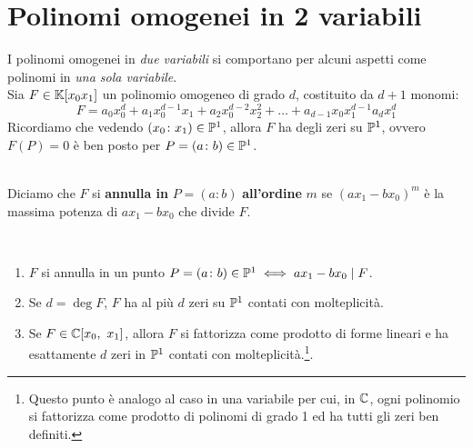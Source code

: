 \section{Polinomi omogenei in 2 variabili}
I polinomi omogenei in \textit{due variabili} si comportano per alcuni aspetti come polinomi in \textit{una sola variabile}.\\
Sia $F\in\mathbb{K}[x_0x_1]$ un polinomio omogeneo di grado $d$, costituito da $d+1$ monomi:
\begin{equation*}
	F=a_0x_0^d+a_1x_0^{d-1}x_1+a_2x_0^{d-2}x_2^2+\ldots + a_{d-1}x_0x_1^{d-1}a_dx_1^d
\end{equation*}
Ricordiamo che vedendo $\left(x_0\colon x_1\right)\in\proj[1]{\ }$, allora $F$ ha degli zeri su $\proj[1]{\ }$, ovvero $F\left(P\right)=0$ è ben posto per $P=(a\colon b)\in\proj[1]{\ }$.
\begin{define}~{}\\
	Diciamo che $F$ si \textbf{annulla in } $P=(a\colon b)$ \textbf{all'ordine } $m$ se $(ax_1-bx_0)^m$ è la massima potenza di $ax_1-bx_0$ che divide $F$.
\end{define}
\begin{proposition}~{}\label{teo polinomi omogenei 2 variabili}
	\begin{enumerate}
		\item	$F$ si annulla in un punto $P=(a\colon b)\in\proj[1]{\ } \iff ax_1-bx_0\mid F$.
		\item 	Se $d=\deg F$, $F$ ha al più $d$ zeri su $\proj[1]{\ }$ contati con molteplicità. %
		\item	Se $F\in\mathbb{C}[x_0,\ x_1]$, allora $F$ si fattorizza come prodotto di forme lineari e ha esattamente $d$ zeri in $\proj[1]{\ }$ contati con molteplicità.\footnote{Questo punto è analogo al caso in una variabile per cui, in $\mathbb{C}$, ogni polinomio si fattorizza come prodotto di polinomi di grado 1 ed ha tutti gli zeri ben definiti.}.
	\end{enumerate}
\vspace{-3mm}
\end{proposition}
